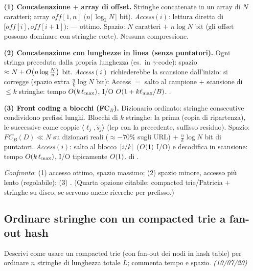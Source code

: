 \textbf{(1) Concatenazione $+$ array di offset.} Stringhe concatenate in un array di $N$
caratteri; array $\mathit{off}[1,n]$ ($n\lceil\log_2 N\rceil$ bit).
\emph{Access}$(i)$: lettura diretta di $[\mathit{off}[i],\mathit{off}[i+1])$:
 --- ottimo. Spazio: $N$ caratteri $+$ $n\log N$ bit
(gli offset possono dominare con stringhe corte). Nessuna compressione.

\textbf{(2) Concatenazione con lunghezze in linea (senza puntatori).} Ogni stringa preceduta dalla
propria lunghezza (es.\ in $\gamma$-code): spazio $\approx N+O\!\left(n\log\frac{N}{n}\right)$ bit.
\emph{Access}$(i)$ richiederebbe la scansione dall'inizio: si corregge  (spazio extra $\frac{n}{k}\log N$ bit): Access $=$ salto al campione
$+$ scansione di $\le k$ stringhe: tempo $O\!\left(k\,\ell_{\max}\right)$, I/O $O\!\left(1+k\ell_{\max}/B\right)$.
.

\textbf{(3) Front coding a blocchi (FC$_B$).} Dizionario ordinato: stringhe consecutive
condividono prefissi lunghi. Blocchi di $k$ stringhe: la prima  (copia di
ripartenza), le successive come coppie $\langle\ell_j,\hat{s}_j\rangle$ (lcp con la precedente,
suffisso residuo). Spazio: $FC_B(D)\ll N$ su dizionari reali ($\approx-70\%$ sugli URL) $+$
$\frac{n}{k}\log N$ bit di puntatori. \emph{Access}$(i)$: salto al blocco $\lceil i/k\rceil$
($O\!\left(1\right)$ I/O) e decodifica in scansione: tempo $O\!\left(k\,\ell_{\max}\right)$, I/O tipicamente $O\!\left(1\right)$.
 di .

\emph{Confronto}: (1) accesso ottimo, spazio massimo; (2) spazio minore, accesso pi\`u lento
(regolabile); (3) .
(Quarta opzione citabile: compacted trie/Patricia $+$ stringhe su disco, se servono anche ricerche
per prefisso.)

\subsection*{ Ordinare stringhe con un compacted trie a fan-out hash}

\begin{domanda}
Descrivi come usare un compacted trie (con fan-out dei nodi in hash table) per ordinare $n$
stringhe di lunghezza totale $L$; commenta tempo e spazio. \emph{(10/07/20)}
\end{domanda}

